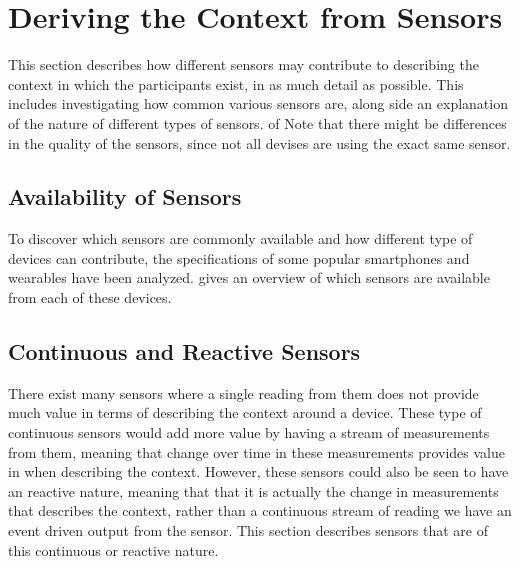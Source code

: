 
\section{Deriving the Context from Sensors}
\label{sec:deriving_the_context_from_sensors}
This section describes how different sensors may contribute to describing the context in which the participants exist, in as much detail as possible. This includes investigating how common various sensors are, along side an explanation of the nature of different types of sensors. of Note that there might be differences in the quality of the sensors, since not all devises are using the exact same sensor.

\subsection{Availability of Sensors}
To discover which sensors are commonly available and how different type of devices can contribute, the specifications of some popular smartphones and wearables have been analyzed.  gives an overview of which sensors are available from each of these devices. 



\subsection{Continuous and Reactive Sensors}
There exist many sensors where a single reading from them does not provide much value in terms of describing the context around a device. These type of continuous sensors would add more value by having a stream of measurements from them, meaning that change over time in these measurements provides value in when describing the context. However, these sensors could also be seen to have an reactive nature, meaning that that it is actually the change in measurements that describes the context, rather than a continuous stream of reading we have an event driven output from the sensor. This section describes sensors that are of this continuous or reactive nature.

